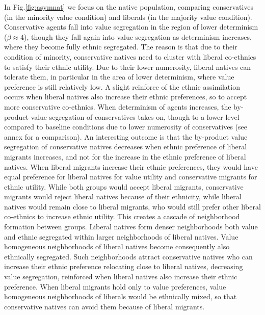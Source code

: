\documentclass[
]{article}
\begin{document}
In Fig.\ref{fig:asymnat} we focus on the native population, comparing conservatives (in the minority value condition) and liberals (in the majority value condition). Conservative agents fall into value segregation in the region of lower determinism ($\beta \approx 4$), though they fall again into value segregation as determinism increases, where they become fully ethnic segregated. The reason is that due to their condition of minority, conservative natives need to cluster with liberal co-ethnics to satisfy their ethnic utility. Due to their lower numerosity, liberal natives can tolerate them, in particular in the area of lower determinism, where value preference is still relatively low. A slight reinforce of the ethnic assimilation  occurs when liberal natives also increase their ethnic preferences, so to accept more conservative co-ethnics. When determinism of agents increases, the by-product value segregation of conservatives takes on, though to a lower level compared to baseline conditions due to lower numerosity of conservatives (see annex for a comparison). An interesting outcome is that the by-product value segregation of conservative natives decreases when ethnic preference of liberal migrants increases, and not for the increase in the ethnic preference of liberal natives. When liberal migrants increase their ethnic preferences, they would have equal preference for liberal natives for value utility and conservative migrants for ethnic utility. While both groups would accept liberal migrants, conservative migrants would reject liberal natives because of their ethnicity, while liberal natives would remain close to liberal migrants, who would still prefer other liberal co-ethnics to increase ethnic utility. This creates a cascade of neighborhood formation between groups. Liberal natives form denser neighborhoods both value and ethnic segregated within larger neighborhoods of liberal natives. Value homogeneous neighborhoods of liberal natives become consequently also ethnically segregated. Such neighborhoods attract conservative natives who can increase their ethnic preference relocating close to liberal natives, decreasing value segregation, reinforced when liberal natives also increase their ethnic preference. When liberal migrants hold only to value preferences, value homogeneous neighborhoods of liberals would be ethnically mixed, so that conservative natives can avoid them because of liberal migrants.
\end{document}
